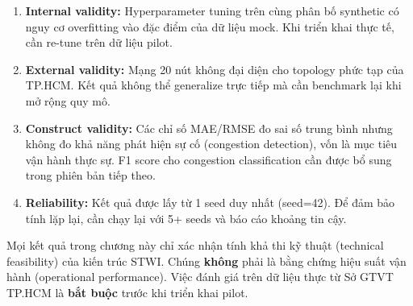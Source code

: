 \begin{enumerate}[itemsep=3pt]
  \item \textbf{Internal validity:} Hyperparameter tuning trên cùng phân bố synthetic có nguy cơ overfitting vào đặc điểm của dữ liệu mock. Khi triển khai thực tế, cần re-tune trên dữ liệu pilot.
  \item \textbf{External validity:} Mạng 20 nút không đại diện cho topo\-logy phức tạp của TP.HCM. Kết quả không thể generalize trực tiếp mà cần benchmark lại khi mở rộng quy mô.
  \item \textbf{Construct validity:} Các chỉ số MAE/RMSE đo sai số trung bình nhưng không đo khả năng phát hiện sự cố (congestion detection), vốn là mục tiêu vận hành thực sự. F1 score cho congestion classification cần được bổ sung trong phiên bản tiếp theo.
  \item \textbf{Reliability:} Kết quả được lấy từ 1 seed duy nhất (seed=42). Để đảm bảo tính lặp lại, cần chạy lại với 5+ seeds và báo cáo khoảng tin cậy.
\end{enumerate}

\begin{tcolorbox}[dangerbox]
Mọi kết quả trong chương này chỉ xác nhận tính khả thi kỹ thuật (technical feasibility) của kiến trúc STWI. Chúng \textbf{không} phải là bằng chứng hiệu suất vận hành (operational performance). Việc đánh giá trên dữ liệu thực từ Sở GTVT TP.HCM là \textbf{bắt buộc} trước khi triển khai pilot.
\end{tcolorbox}
